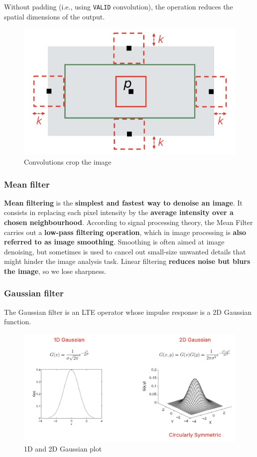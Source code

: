 Without padding (i.e., using \texttt{VALID} convolution), the operation reduces the spatial dimensions of the output.

\begin{figure}[htbp]
  \centering
  \includegraphics[width=0.55\linewidth]{./img/convolution_visualization.jpg}
  \caption{Convolutions crop the image}
  \label{fig:convolution_visualization}
\end{figure}

\subsubsection{Mean filter}

\textbf{Mean filtering} is the \textbf{simplest and fastest way to denoise an image}.
It consists in replacing each pixel intensity by the \textbf{average intensity over a chosen neighbourhood}.
According to signal processing theory, the Mean Filter carries out a \textbf{low-pass filtering operation}, which in image processing is \textbf{also referred to as image smoothing}.
Smoothing is often aimed at image denoising, but sometimes is used to cancel out small-size unwanted details that might hinder the image analysis task.
Linear filtering \textbf{reduces noise but blurs the image}, so we lose sharpness.

\subsubsection{Gaussian filter}

The Gaussian filter is an LTE operator whose impulse response is a 2D Gaussian function.

\begin{figure}[htbp]
  \centering
  \includegraphics[width=0.7\linewidth]{./img/gaussian_filter.jpg}
  \caption{1D and 2D Gaussian plot}
  \label{fig:gaussian_filter}
\end{figure}

